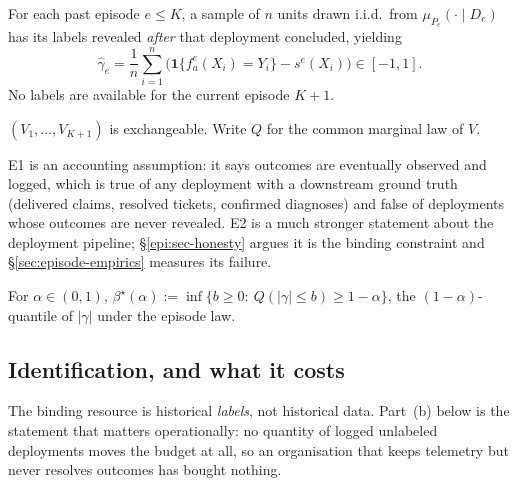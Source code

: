 \begin{assumption}\label{epi:ass-E1}
For each past episode $e\le K$, a sample of $n$ units drawn i.i.d.\ from $\mu_{P_e}(\cdot\mid D_e)$
has its labels revealed \emph{after} that deployment concluded, yielding
\[
\widehat\gamma_e=\frac1n\sum_{i=1}^{n}\bigl(\mathbf 1\{f_a^e(X_i)=Y_i\}-s^e(X_i)\bigr)\in[-1,1].
\]
No labels are available for the current episode $K+1$.
\end{assumption}

\begin{assumption}\label{epi:ass-E2}
$(V_1,\dots,V_{K+1})$ is exchangeable. Write $Q$ for the common marginal law of $V$.
\end{assumption}

E1 is an accounting assumption: it says outcomes are eventually observed and logged, which is true
of any deployment with a downstream ground truth (delivered claims, resolved tickets, confirmed
diagnoses) and false of deployments whose outcomes are never revealed. E2 is a much stronger
statement about the deployment pipeline; \S\ref{epi:sec-honesty} argues it is the binding constraint
and \S\ref{sec:episode-empirics} measures its failure.

\begin{definition}\label{epi:def-beta-star}
For $\alpha\in(0,1)$, $\beta^\star(\alpha):=\inf\{b\ge0:\ Q(|\gamma|\le b)\ge1-\alpha\}$, the
$(1-\alpha)$-quantile of $|\gamma|$ under the episode law.
\end{definition}

\subsection{Identification, and what it costs}

The binding resource is historical \emph{labels}, not historical data. Part~(b) below is the
statement that matters operationally: no quantity of logged unlabeled deployments moves the budget
at all, so an organisation that keeps telemetry but never resolves outcomes has bought nothing.

